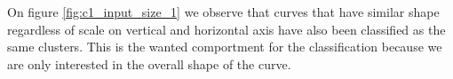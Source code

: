 On figure \ref{fig:c1_input_size_1} we observe that curves that have similar shape regardless of scale on vertical and horizontal axis have also been classified as the same clusters. This is the wanted comportment for the classification because we are only interested in the overall shape of the curve.











